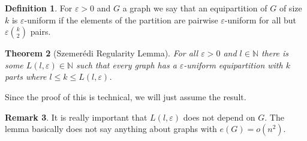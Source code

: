 \documentclass{report}
\theoremstyle{definition}
\theoremstyle{plain}
\newtheorem{thm}{Theorem}
\theoremstyle{definition}
\newtheorem{defn}[thm]{Definition}
\newtheorem{rem}[thm]{Remark}
\begin{document}
 	\begin{defn}
 		For $\varepsilon>0$ and $G$ a graph we say that an equipartition of $G$ of size $k$ is $\varepsilon$-uniform if the elements of the partition are pairwise $\varepsilon$-uniform for all but $\varepsilon\binom{k}{2}$ pairs.
 	\end{defn}
 	\begin{thm}[Szemerédi Regularity Lemma]
 		For all $\varepsilon > 0$ and $l\in\mathbb{N}$ there is some $L(l,\varepsilon) \in\mathbb{N}$ such that every graph has a $\varepsilon$-uniform equipartition with $k$ parts where $l\leq k \leq L(l,\varepsilon)$.
 	\end{thm}
 	Since the proof of this is technical, we will just assume the result.
 	\begin{rem}
 		It is really important that $L(l,\varepsilon)$ does not depend on $G$. The lemma basically does not say anything about graphs with $e(G) = o(n^2)$.
 	\end{rem}
\end{document}
